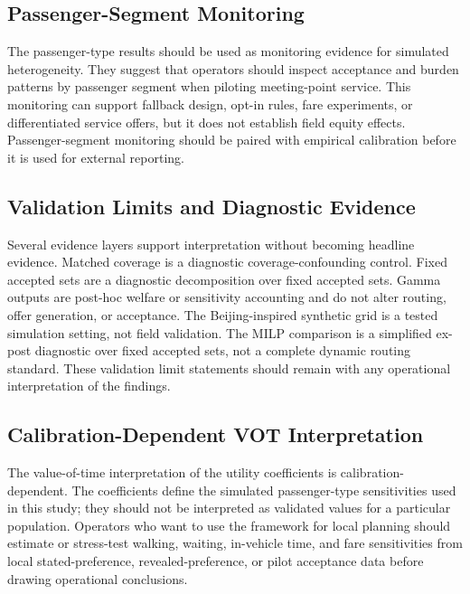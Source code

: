 \subsection{Passenger-Segment Monitoring}

The passenger-type results should be used as monitoring evidence for simulated
heterogeneity. They suggest that operators should inspect acceptance and burden patterns
by passenger segment when piloting meeting-point service. This monitoring can support
fallback design, opt-in rules, fare experiments, or differentiated service offers, but it
does not establish field equity effects. Passenger-segment monitoring should be
paired with empirical calibration before it is used for external reporting.

\subsection{Validation Limits and Diagnostic Evidence}

Several evidence layers support interpretation without becoming headline evidence.
Matched coverage is a diagnostic coverage-confounding control. Fixed accepted sets are a
diagnostic decomposition over fixed accepted sets. Gamma outputs are post-hoc welfare or
sensitivity accounting and do not alter routing, offer generation, or acceptance. The
Beijing-inspired synthetic grid is a tested simulation setting, not field validation. The
MILP comparison is a simplified ex-post diagnostic over fixed accepted sets, not a
complete dynamic routing standard. These validation limit statements should remain with
any operational interpretation of the findings.

\subsection{Calibration-Dependent VOT Interpretation}\label{subsec:vot-mapping}

The value-of-time interpretation of the utility coefficients is calibration-dependent.
The coefficients define the simulated passenger-type sensitivities used in this study;
they should not be interpreted as validated values for a particular population. Operators
who want to use the framework for local planning should estimate or stress-test walking,
waiting, in-vehicle time, and fare sensitivities from local stated-preference,
revealed-preference, or pilot acceptance data before drawing operational conclusions.
